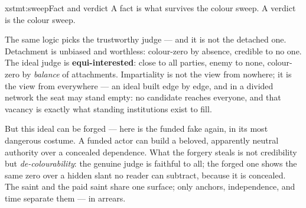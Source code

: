 \documentclass[../main_explainer]{subfiles}
\begin{document}
\begin{statement}{xstmt:sweep}{Fact and verdict}
  A fact is what survives the colour sweep. A verdict is the colour sweep.
\end{statement}

The same logic picks the trustworthy judge --- and it is not the detached one.
Detachment is unbiased and worthless: colour-zero by absence, credible to no one. The
ideal judge is \textbf{equi-interested}: close to all parties, enemy to none,
colour-zero by \emph{balance} of attachments. Impartiality is not the view from nowhere;
it is the view from everywhere --- an ideal built edge by edge, and in a divided network
the seat may stand empty: no candidate reaches everyone, and that vacancy is exactly
what standing institutions exist to fill.


But this ideal can be forged --- here is the funded fake again, in its most dangerous
costume. A funded actor can build a beloved, apparently neutral authority over a
concealed dependence. What the forgery steals is not credibility but
\emph{de-colourability}: the genuine judge is faithful to all; the forged one shows the
same zero over a hidden slant no reader can subtract, because it is concealed. The saint
and the paid saint share one surface; only anchors, independence, and time separate them
--- in arrears.

\end{document}
